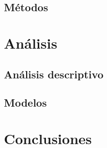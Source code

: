 \documentclass[12pt,twoside]{templates/facsothesis}
\begin{document}
\hypertarget{muxe9todos}{%
\section{Métodos}\label{muxe9todos}}

\hypertarget{anuxe1lisis}{%
\chapter{Análisis}\label{anuxe1lisis}}

\hypertarget{anuxe1lisis-descriptivo}{%
\section{Análisis descriptivo}\label{anuxe1lisis-descriptivo}}

\hypertarget{modelos}{%
\section{Modelos}\label{modelos}}

\hypertarget{conclusiones}{%
\chapter{Conclusiones}\label{conclusiones}}



\end{document}
